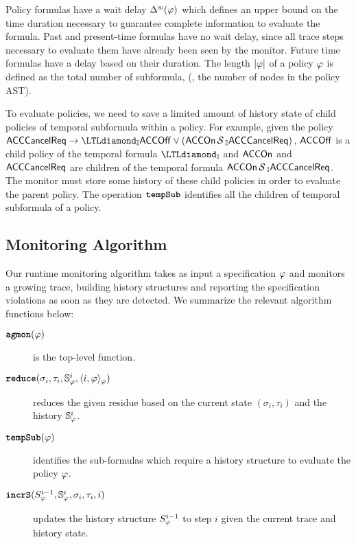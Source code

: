 Policy formulas have a wait delay $\Delta^w(\varphi)$ which defines an upper bound on the time duration necessary to guarantee complete information to evaluate the formula. Past and present-time formulas have no wait delay, since all trace steps necessary to evaluate them have already been seen by the monitor. Future time formulas have a delay based on their duration. The length $|\varphi|$ of a policy $\varphi$ is defined as the total number of subformula, (\ie, the number of nodes in the policy AST).

To evaluate \planguage policies, we need to save a limited amount of history state of child policies of temporal subformula within a policy. For example, given the policy $\pred{ACCCancelReq} \rightarrow \eventually_{\interval} \pred{ACCOff} \vee (\pred{ACCOn} \since_{\interval} \pred{ACCCancelReq})$, $\mathsf{ACCOff}$ is a child policy of the temporal formula $\eventually_{\interval}$ and $\mathsf{ACCOn}$ and $\mathsf{ACCCancelReq}$ are children of the temporal formula $\mathsf{ACCOn} \,\mathrm{\cal S}\,_{\mathbb{I}} \mathsf{ACCCancelReq}$. The monitor must store some history of these child policies in order to evaluate the parent policy.
The operation $\textbf{\texttt{tempSub}}$ identifies all the children of temporal subformula of a policy.




\subsection{Monitoring Algorithm}
Our runtime monitoring algorithm \monitor takes as input a specification $\varphi$ and monitors a growing trace, building history structures and reporting the specification violations as soon as they are detected. We summarize the relevant algorithm functions below:

\begin{description}
\item[$\textbf{\texttt{agmon}}{}(\varphi)$] is the top-level function. 
\item[$\textbf{\texttt{reduce}}(\sigma_i, \tau_i, \mathbb{S}^{i}_{\varphi}, \langle i, \varphi \rangle_{\varphi})$] reduces the given residue based on the current state $(\sigma_i,\tau_i)$ and the history $\mathbb{S}^{i}_{\varphi}$.
\item[$\textbf{\texttt{tempSub}}(\varphi)$] identifies the sub-formulas which require a history structure to evaluate the policy $\varphi$.
\item[$\textbf{\texttt{incrS}}({S}^{i-1}_{\varphi}, \mathbb{S}^{i}_{\varphi}, \sigma_i, \tau_i, i)$] updates the history structure ${S}^{i-1}_{\varphi}$ to step $i$ given the current trace and history state.
\end{description}




